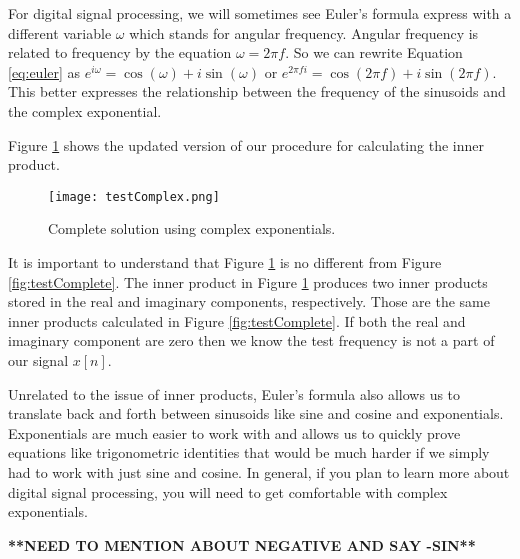 For digital signal processing, we will sometimes see Euler's formula express with a different variable $\omega$ which
stands for angular frequency.  Angular frequency is related to frequency by the equation $\omega = 2\pi f$.  So
we can rewrite Equation \ref{eq:euler} as $e^{i\omega} = \cos(\omega) + i\sin(\omega)$ or 
$e^{2\pi fi} = \cos(2 \pi f) + i\sin(2\pi f)$.  This better expresses the relationship between the frequency of the
sinusoids and the complex exponential.

Figure \ref{fig:testComplex} shows the updated version of our procedure for calculating the inner product.

\begin{figure}[h]
	\caption{Complete solution using complex exponentials.}
	\centering
	\texttt{[image: testComplex.png]}
	\label{fig:testComplex}
\end{figure}

It is important to understand that Figure \ref{fig:testComplex} is no different from Figure \ref{fig:testComplete}.  
The inner product in Figure \ref{fig:testComplex} produces two inner products stored in the real and imaginary
components, respectively.  Those are the same inner products calculated in Figure \ref{fig:testComplete}.  If
both the real and imaginary component are zero then we know the test frequency is not a part of our signal
$x[n]$.

Unrelated to the issue of inner products, Euler's
formula also allows us to translate back and forth between sinusoids like sine and cosine and exponentials.
Exponentials are much easier to work with and allows us to quickly prove equations like trigonometric identities
that would be much harder if we simply had to work with just sine and cosine.  In general, if you plan to learn
more about digital signal processing, you will need to get comfortable with complex exponentials.

\textbf{**NEED TO MENTION ABOUT NEGATIVE AND SAY -SIN**}